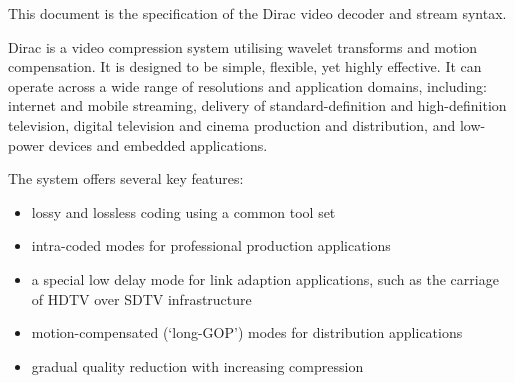 
This document is the specification of the Dirac video decoder and stream syntax.

Dirac is a video compression system utilising wavelet transforms and motion
compensation. It is designed to be simple, flexible, yet highly effective. 
It can operate across a wide range of resolutions and
application domains, including: internet and mobile streaming, delivery of 
standard-definition and high-definition
television, digital television and cinema production and distribution,
and low-power devices and embedded applications.

The system offers several key features:
\begin{itemize}
\item lossy and lossless coding using a common tool set
\item intra-coded modes for professional production applications
\item a special low delay mode for link adaption applications, such as the carriage of HDTV
over SDTV infrastructure
 \item motion-compensated (`long-GOP') modes for distribution applications
\item gradual quality reduction with increasing compression 
\end{itemize}


